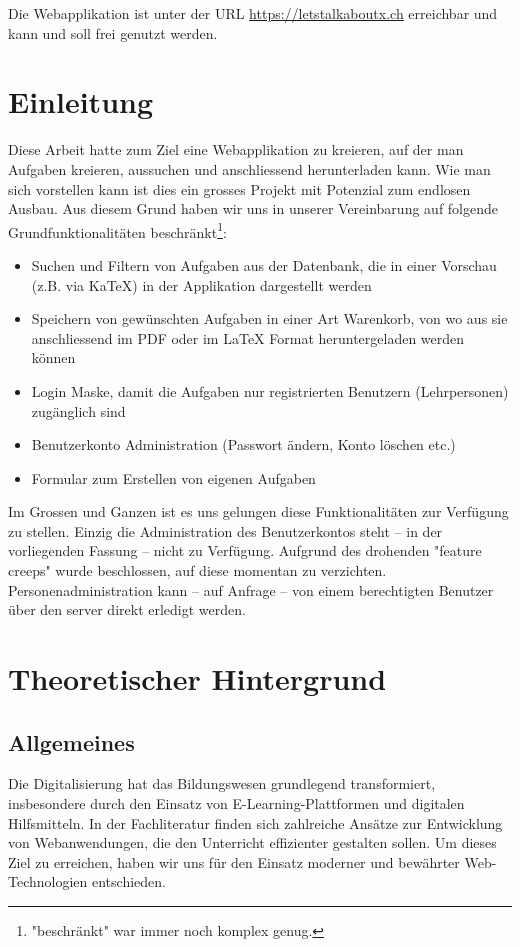 \documentclass[12pt,a4paper]{scrartcl} %
\begin{document}
Die Webapplikation ist unter der URL \url{https://letstalkaboutx.ch} erreichbar und kann und soll frei genutzt werden.


\newpage

\section{Einleitung}

Diese Arbeit hatte zum Ziel eine Webapplikation zu kreieren, auf der man Aufgaben kreieren, aussuchen und anschliessend herunterladen kann. Wie man sich vorstellen kann ist dies ein grosses Projekt mit Potenzial zum endlosen Ausbau. Aus diesem Grund haben wir uns in unserer Vereinbarung auf folgende Grundfunktionalitäten beschränkt\footnote{"beschränkt" war immer noch komplex genug.}:
\begin{itemize}
  \item Suchen und Filtern von Aufgaben aus der Datenbank, die in einer Vorschau (z.B. via KaTeX) in der Applikation dargestellt werden
  \item Speichern von gewünschten Aufgaben in einer Art Warenkorb, von wo aus sie anschliessend im PDF oder im LaTeX Format heruntergeladen werden können
  \item Login Maske, damit die Aufgaben nur registrierten Benutzern (Lehrpersonen) zugänglich sind
  \item Benutzerkonto Administration (Passwort ändern, Konto löschen etc.)
  \item Formular zum Erstellen von eigenen Aufgaben
\end{itemize}

Im Grossen und Ganzen ist es uns gelungen diese Funktionalitäten zur Verfügung zu stellen. Einzig die Administration des Benutzerkontos steht -- in der vorliegenden Fassung -- nicht zu Verfügung. Aufgrund des drohenden "feature creeps" wurde beschlossen, auf diese momentan zu verzichten. Personenadministration kann -- auf Anfrage -- von einem berechtigten Benutzer über den server direkt erledigt werden.




\section{Theoretischer Hintergrund}
\subsection{Allgemeines}
Die Digitalisierung hat das Bildungswesen grundlegend transformiert, insbesondere durch den Einsatz von E-Learning-Plattformen und digitalen Hilfsmitteln. In der Fachliteratur finden sich zahlreiche Ansätze zur Entwicklung von Webanwendungen, die den Unterricht effizienter gestalten sollen. Um dieses Ziel zu erreichen, haben wir uns für den Einsatz moderner und bewährter Web-Technologien entschieden.
\end{document}
